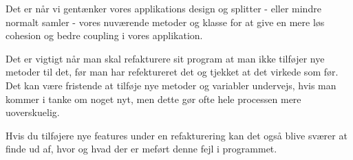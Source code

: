 \documentclass{article}
\begin{document}
Det er når vi gentænker vores applikations design og splitter - eller mindre normalt samler - vores nuværende metoder og klasse for at give en mere løs cohesion og bedre coupling i vores applikation.

Det er vigtigt når man skal refakturere sit program at man ikke tilføjer nye metoder til det, før man har refektureret det og tjekket at det virkede som før. Det kan være fristende at tilføje nye metoder og variabler undervejs, hvis man kommer i tanke om noget nyt, men dette gør ofte hele processen mere uoverskuelig.

Hvis du tilføjere nye features under en refakturering kan det også blive sværer at finde ud af, hvor og hvad der er meført denne fejl i programmet.
\end{document}
